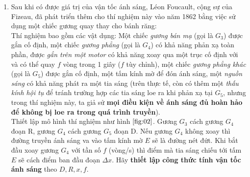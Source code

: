 \begin{enumerate}
    \item
    Sau khi có được giá trị của vận tốc ánh sáng, Léon Foucault, cộng sự của Fizeau, đã phát triển thêm cho thí nghiệm này vào năm 1862 bằng việc sử dụng một chiếc gương quay thay cho bánh răng: \\

    Thí nghiệm bao gồm các vật dụng: Một chiếc \textit{gương bán mạ} (gọi là $G_3$) được gắn cố định, một chiếc \textit{gương phẳng} (gọi là $G_4$) có khả năng phản xạ toàn phần, được \textit{gắn trên một motor} có khả năng xoay qua một trục cố định với và có thể quay $f$ vòng trong 1 giây ($f$ tùy chỉnh), một chiếc \textit{gương phẳng khác} (gọi là $G_5$) được gắn cố định, một tấm kính mờ để đón ánh sáng, một \textit{nguồn sáng} có khả năng phát ra một tia sáng (trên thực tế, còn có thêm một \textit{thấu kính hội tụ} để tránh trường hợp các tia sáng loe ra khi phản xạ tại $G_5$, nhưng trong thí nghiệm này, ta giả sử \textbf{mọi điều kiện về ánh sáng đủ hoàn hảo để không bị loe ra trong quá trình truyền}). \\

    Thiết lập mô hình thí nghiệm như hình $\ref{fig:02}$. Gương $G_3$ cách gương $G_4$ đoạn R, gương $G_4$ cách gương $G_5$ đoạn D. Nếu gương $G_4$ không xoay thì đường truyền ánh sáng va vào tấm kính mờ $E$ sẽ là đường nét đứt. Khi bắt đầu xoay gương $G_4$ với tần số $f$ (vòng/s) thì điểm mà tia sáng chiếu tới tấm $E$ sẽ cách điểm ban đầu đoạn $\Delta x$. Hãy \textbf{thiết lập công thức tính vận tốc ánh sáng} theo $D, R, x, f$.

\begin{figure}[!h]
    \centering
\end{figure}
\end{enumerate}
